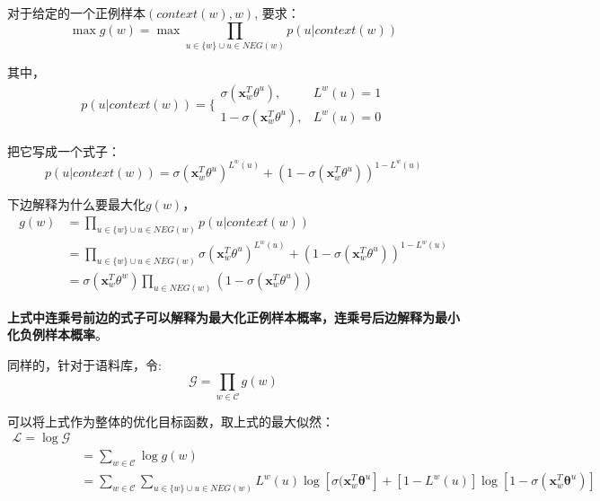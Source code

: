 对于给定的一个正例样本$(context(w), w)$, 要求：
\begin{equation}
    \max g(w) = \max \prod_{u \in \{w\} \cup u \in NEG(w)} p(u|context(w))
\end{equation}

其中， 
\begin{equation}
    p(u|context(w)) = \Bigg \{ \begin{array}{ll}
        \sigma(\boldsymbol{x}_w^T \theta^u), & L^w(u) = 1\\
        1-\sigma(\boldsymbol{x}_w^T \theta^u), & L^w(u) = 0
        \end{array}
\end{equation}

把它写成一个式子：
\begin{equation}
    p(u|context(w)) = \sigma(\boldsymbol{x}_w^T \theta^u)^{L^w(u)} + (1-\sigma(\boldsymbol{x}_w^T \theta^u))^{1-L^w(u)}
\end{equation}

下边解释为什么要最大化$g(w)$，
\begin{equation}
    \begin{split}
        g(w) &= \prod_{u \in \{w\} \cup u \in NEG(w)} p(u|context(w)) \\
        &=\prod_{u \in \{w\} \cup u \in NEG(w)}  \sigma(\boldsymbol{x}_w^T \theta^u)^{L^w(u)} + (1-\sigma(\boldsymbol{x}_w^T \theta^u))^{1-L^w(u)} \\ 
        &=\sigma(\boldsymbol{x}_w^T \theta^w)\prod_{u \in NEG(w)} (1-\sigma(\boldsymbol{x}_w^T \theta^u))
    \end{split}
\end{equation}

\textbf{上式中连乘号前边的式子可以解释为最大化正例样本概率，连乘号后边解释为最小化负例样本概率}。

同样的，针对于语料库，令:
\begin{equation}
    \mathcal{G} = \prod_{w \in \mathcal{C}} g(w)
\end{equation}

可以将上式作为整体的优化目标函数，取上式的最大似然：
\begin{equation}
    \begin{split}
    \mathcal{L} = \log\mathcal{G} \\
    &= \sum_{w \in \mathcal{C}} \log g(w) \\
    &=\sum_{w \in \mathcal{C}} \sum_{u \in \{w\} \cup u \in NEG(w)}L^w(u)\log[\sigma(\boldsymbol{x}_w^T \boldsymbol{\theta}^u] + [1-L^w(u)]
    \log [1-\sigma(\boldsymbol{x}_w^T \boldsymbol{\theta}^u)]
\end{split}
\end{equation}

